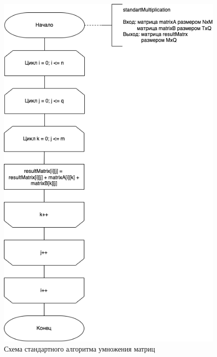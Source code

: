 \begin{figure}[ht!]
	\centering
	\includegraphics[width=0.9\linewidth]{img/Standard.png}
	\caption{Схема стандартного алгоритма умножения матриц}
	\label{fig:mpr}
\end{figure}

